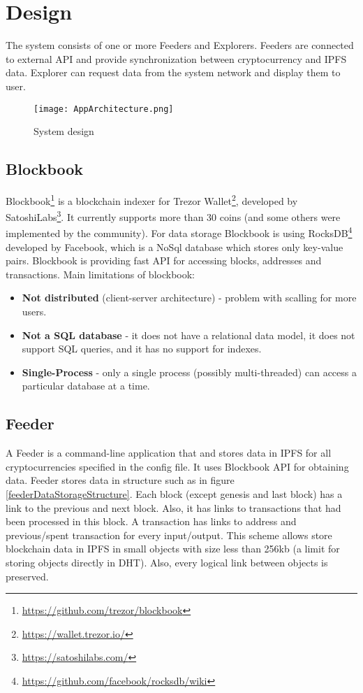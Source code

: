 \chapter{Design}
\label{Design}

The system consists of one or more Feeders and Explorers. Feeders are connected to external API and provide synchronization between cryptocurrency and IPFS data. Explorer can request data from the system network and display them to user.

\begin{figure}[h]
    \centering
    \texttt{[image: AppArchitecture.png]}
    \caption{System design}
    \label{}
\end{figure}

\section{Blockbook}
Blockbook\footnote{\url{https://github.com/trezor/blockbook}} is a blockchain indexer for Trezor Wallet\footnote{\url{https://wallet.trezor.io/}}, developed by SatoshiLabs\footnote{\url{https://satoshilabs.com/}}. It currently supports more than 30 coins (and some others were implemented by the community). For data storage Blockbook is using RocksDB\footnote{\url{https://github.com/facebook/rocksdb/wiki}} developed by Facebook, which is a NoSql database which stores only key-value pairs. Blockbook is providing fast API for accessing blocks, addresses and transactions. Main limitations of blockbook:
\begin{itemize}
    \item \textbf{Not distributed} (client-server architecture) - problem with scalling for more users. 
    \item \textbf{Not a SQL database} - it does not have a relational data model, it does not support SQL queries, and it has no support for indexes.
    \item \textbf{Single-Process} - only a single process (possibly multi-threaded) can access a particular database at a time.
\end{itemize}

\section{Feeder}
A Feeder is a command-line application that and stores data in IPFS for all cryptocurrencies specified in the config file. It uses Blockbook API for obtaining data. Feeder stores data in structure such as in figure \ref{feederDataStorageStructure}. Each block (except genesis and last block) has a link to the previous and next block. Also, it has links to transactions that had been processed in this block. A transaction has links to address and previous/spent transaction for every input/output. This scheme allows store blockchain data in IPFS in small objects with size less than 256kb (a limit for storing objects directly in DHT). Also, every logical link between objects is preserved. 

